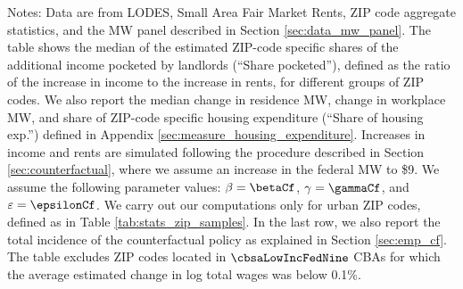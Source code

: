 \begin{table}[hbt!]
    \begin{minipage}{.95\textwidth} \footnotesize
        \vspace{4mm}
        Notes: 
        Data are from LODES, Small Area Fair Market Rents, ZIP code aggregate 
        statistics, and the MW panel described in Section \ref{sec:data_mw_panel}.
        The table shows the median of the estimated ZIP-code specific shares of 
        the additional income pocketed by landlords (``Share pocketed''), 
        defined as the ratio of the increase in income to the increase in rents,
        for different groups of ZIP codes.
        We also report the median change in residence MW, change in workplace MW,
        and share of ZIP-code specific housing expenditure 
        (``Share of housing exp.'') defined in Appendix 
        \ref{sec:measure_housing_expenditure}.
        Increases in income and rents are simulated following the procedure 
        described in Section \ref{sec:counterfactual},
        where we assume an increase in the federal MW to \$9.
        We assume the following parameter values: 
        $\beta = \betaCf$, $\gamma = \gammaCf$, and $\varepsilon = \epsilonCf$.
        We carry out our computations only for urban ZIP codes, defined as 
        in Table \ref{tab:stats_zip_samples}.
        In the last row, we also report the total incidence of the counterfactual 
        policy as explained in Section \ref{sec:emp_cf}.
        The table excludes ZIP codes located in $\cbsaLowIncFedNine$ CBAs for 
        which the average estimated change in log total wages was below 0.1\%.
    \end{minipage}
\end{table}


